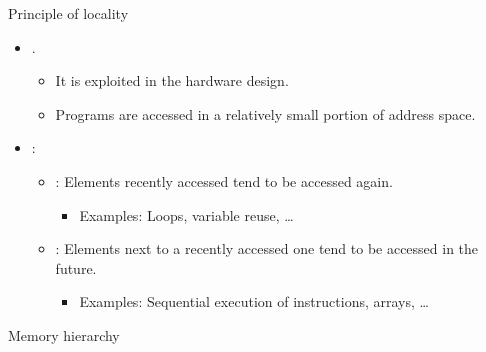 \begin{frame}[t]{Principle of locality}
\begin{itemize}
  \item {}.
    \begin{itemize}
      \item It is  exploited in the hardware design.
      \item Programs are accessed in a relatively small portion of address space.
    \end{itemize}

  \item {}:
    \begin{itemize}
      \item {}: 
            Elements recently accessed tend to be accessed again.
        \begin{itemize}
          \item Examples: Loops, variable reuse, \ldots
        \end{itemize}
      \item {}: 
            Elements next to a recently accessed one tend to be accessed in the future.
        \begin{itemize}
          \item Examples: Sequential execution of instructions, arrays, \ldots
        \end{itemize}
    \end{itemize}
\end{itemize}
\end{frame}

\begin{frame}[t]{Memory hierarchy}
\makebox[\textwidth][c]{

}
\end{frame}


